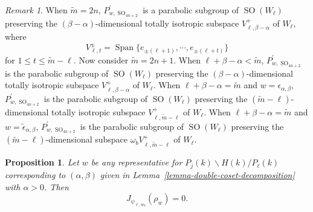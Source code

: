 \documentclass[12pt]{amsart}
\newcommand{\wt}{\widetilde}
\newcommand{\Span}{\operatorname{Span}}
\newtheorem{proposition}[theorem]{Proposition}%
\theoremstyle{remark}
\newtheorem{remark}[theorem]{Remark}%
\DeclareMathOperator{\SO}{SO}
\begin{document}
\begin{remark}
\label{remark-parabolic-subgroup}
When $\wt m=2n$, $P_{w, \SO_{4n+2}}^\prime$ is a parabolic subgroup of $\SO(W_{\ell})$ preserving the  $(\beta-\alpha)$-dimensional totally isotropic subspace $V_{\ell, \beta-\alpha}^+$ of $W_{\ell}$, where
\begin{equation}
\label{eq-subspace-V-lt}
V_{\ell, t}^{\pm}=\Span\{e_{\pm (\ell+ 1)}, \cdots, e_{\pm (\ell+t)} \}
\end{equation}
for $1\le t\le \wt{m}-\ell$. Now consider $\wt m=2n+1$. When $\ell+\beta-\alpha<\wt m$, $P_{w, \SO_{4n+2}}^\prime$ is the parabolic subgroup of $\SO(W_{\ell})$ preserving the $(\beta-\alpha)$-dimensional totally isotropic subspace $V_{\ell, \beta-\alpha}^+$ of $W_{\ell}$. When $\ell+\beta-\alpha=\wt m$ and $w=\epsilon_{\alpha,\beta}$, $P_{w, \SO_{4n+2}}^\prime$ is the parabolic subgroup of $\SO(W_{\ell})$ preserving the $(\wt m-\ell)$-dimensional totally isotropic subspace $V_{\ell, \wt m-\ell}^+$ of $W_{\ell}$. When $\ell+\beta-\alpha=\wt m$ and $w=\tilde{\epsilon}_{\alpha,\beta}$, $P_{w, \SO_{4n+2}}^\prime$ is the parabolic subgroup of $\SO(W_{\ell})$ preserving the $(\wt m-\ell)$-dimensional subspace $\omega_b V_{\ell,\wt m-\ell}^+$ of $W_{\ell}$.
\end{remark}



\begin{proposition}
\label{prop-JacquetModuleVanishing-alpha>0}
Let $w$ be any representative for $P_j(k)\backslash H(k)/P_\ell(k)$ corresponding to $(\alpha, \beta)$ given in Lemma~\ref{lemma-double-coset-decomposition} with $\alpha>0$. Then 
\begin{equation*}
J_{\psi_{\ell, w_0}}(\rho_w)=0.	
\end{equation*}
\end{proposition}
\end{document}
